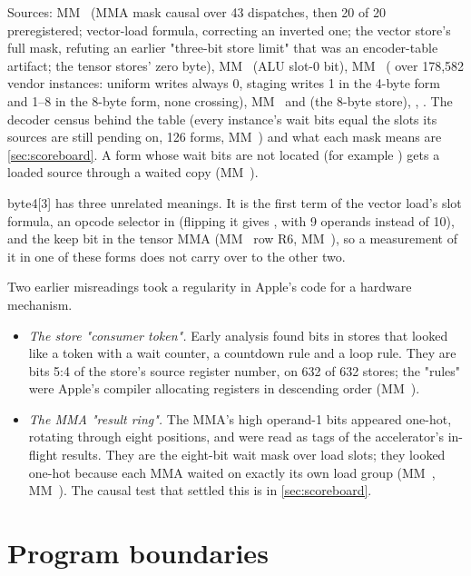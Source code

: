Sources: MM~ (MMA mask causal over 43 dispatches, then 20 of 20 preregistered; vector-load formula, correcting an
inverted one; the vector store's full mask, refuting an earlier "three-bit store limit" that was an encoder-table
artifact; the tensor stores' zero byte), MM~ (ALU slot-0 bit), MM~ ( over
178,582 vendor instances: uniform writes always 0, staging writes 1 in the 4-byte form and 1–8 in the 8-byte form, none
crossing), MM~ and  (the 8-byte store), , .
The decoder census behind the table (every instance's wait bits equal the slots its sources are still pending on, 126
forms, MM~) and what each mask means are \cref{sec:scoreboard}. A form whose wait bits are not located (for example ) gets a loaded source through a waited copy (MM~).

byte4{[}3{]} has three unrelated meanings. It is the first term of the vector load's slot formula, an opcode selector
in  (flipping it gives , with 9 operands instead of 10), and the keep bit
in the tensor MMA (MM~ row R6, MM~), so a measurement of it in one of these forms does not carry
over to the other two.

Two earlier misreadings took a regularity in Apple's code for a hardware mechanism.

\begin{itemize}
\item \emph{The store "consumer token".} Early analysis found bits in stores that looked like a token with a wait counter, a
  countdown rule and a loop rule. They are bits 5:4 of the store's source register number, on 632 of 632 stores; the
  "rules" were Apple's compiler allocating registers in descending order (MM~).
\item \emph{The MMA "result ring".} The MMA's high operand-1 bits appeared one-hot, rotating through eight positions, and were read
  as tags of the accelerator's in-flight results. They are the eight-bit wait mask over load slots; they looked one-hot
  because each MMA waited on exactly its own load group (MM~, MM~). The causal test that settled this is in
  \cref{sec:scoreboard}.
\end{itemize}

\section{Program boundaries}\label{sec:program-boundaries}

